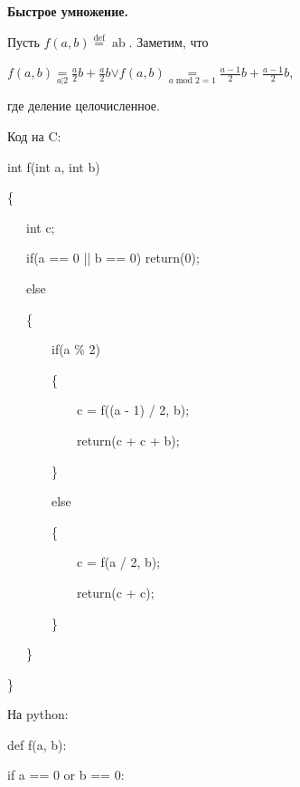 \documentclass{letter}
\newcommand{\tmop}[1]{\ensuremath{\operatorname{#1}}}
\newcommand{\tmstrong}[1]{\textbf{#1}}
\newcommand{\tmtextbf}[1]{{\bfseries{#1}}}
\newenvironment{enumeratenumeric}{\begin{enumerate}[1.] }{\end{enumerate}}
\newenvironment{tmindent}{\begin{tmparmod}{1.5em}{0pt}{0pt} }{\end{tmparmod}}
\newenvironment{tmparmod}[3]{\begin{list}{}{\setlength{\topsep}{0pt}\setlength{\leftmargin}{#1}\setlength{\rightmargin}{#2}\setlength{\parindent}{#3}\setlength{\listparindent}{\parindent}\setlength{\itemindent}{\parindent}\setlength{\parsep}{\parskip}} \item[]}{\end{list}}
\newenvironment{tmparsep}[1]{\begingroup\setlength{\parskip}{#1}}{\endgroup}
\begin{document}
\begin{enumeratenumeric}
  \item \tmtextbf{Быстрое умножение.}
  
  Пусть $f \left( a, b \right) \overset{\tmop{def}}{=} \tmop{ab}$.
  Заметим, что
  
  $f \left( a, b \right) \underset{a \vdots 2}{=} \frac{a}{2} b + \frac{a}{2}
  b${\tmstrong{$\vee$}}$f \left( a, b \right) \underset{a \tmop{mod} 2 = 1}{=}
  \frac{a - 1}{2} b + \frac{a - 1}{2} b$,
  
  где деление целочисленное.
  
  Код на C:
  
  {\noindent}\begin{tmindent}
    \begin{tmparsep}{0em}
      int f(int a, int b)
      
      \{
      
      \ \ \ int c;
      
      \ \ \ if(a == 0 || b == 0) return(0);
      
      \ \ \ else
      
      \ \ \ \{
      
      \ \ \ \ \ \ \ if(a \% 2)
      
      \ \ \ \ \ \ \ \{
      
      \ \ \ \ \ \ \ \ \ \ \ c = f((a - 1) / 2, b);
      
      \ \ \ \ \ \ \ \ \ \ \ return(c + c + b);
      
      \ \ \ \ \ \ \ \}
      
      \ \ \ \ \ \ \ else
      
      \ \ \ \ \ \ \ \{
      
      \ \ \ \ \ \ \ \ \ \ \ c = f(a / 2, b);
      
      \ \ \ \ \ \ \ \ \ \ \ return(c +{\text{}} c);
      
      \ \ \ \ \ \ \ \}
      
      \ \ \ \}
      
      \}
    \end{tmparsep}
  \end{tmindent}{\hspace*{\fill}}{\medskip}
  
  На python:
  
  {\noindent}\begin{tmindent}
    \begin{tmparsep}{0em}
      def f(a, b):
      
      if a == 0 or b == 0:
      

\end{tmparsep}
\end{tmindent}
\end{enumeratenumeric}
\end{document}
